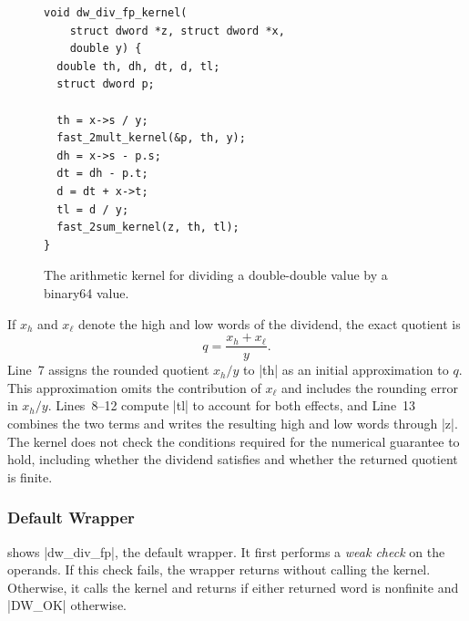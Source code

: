 \begin{figure}[t]
  \begin{sectiontwocpanel}
  \begin{lstlisting}[style=sectiontwoc]
void dw_div_fp_kernel(
    struct dword *z, struct dword *x,
    double y) {
  double th, dh, dt, d, tl;
  struct dword p;

  th = x->s / y;
  fast_2mult_kernel(&p, th, y);
  dh = x->s - p.s;
  dt = dh - p.t;
  d = dt + x->t;
  tl = d / y;
  fast_2sum_kernel(z, th, tl);
}
\end{lstlisting}
  \end{sectiontwocpanel}
  \caption{The arithmetic kernel for dividing a
  double-double value by a binary64 value.}
  \label{fig:dw-div-fp-kernel}
\end{figure}

If $x_h$ and $x_\ell$ denote the high and low words of the dividend, the exact
quotient is
\[
  q=\frac{x_h+x_\ell}{y}.
\]
Line~7 assigns the rounded quotient $x_h/y$ to \ccode|th| as an initial
approximation to $q$. This approximation omits the contribution of $x_\ell$
and includes the rounding error in $x_h/y$. Lines~8--12 compute
\ccode|tl| to account for both effects, and Line~13 combines the two terms
and writes the resulting high and low words through \ccode|z|. 
The kernel does not check the conditions required for the numerical
guarantee to hold, including whether the dividend satisfies
 and whether the returned quotient is finite.

\subsubsection{Default Wrapper}
\label{sec:overview-division-wrappers}

\begingroup
\setlength{\emergencystretch}{1em}
 shows \ccode|dw_div_fp|, the default
wrapper. It first performs a \emph{weak check} on the operands. If this
check fails, the wrapper returns
without calling the kernel. Otherwise, it calls the kernel and returns
if either returned word is nonfinite and \ccode|DW_OK| otherwise.
\par
\endgroup

